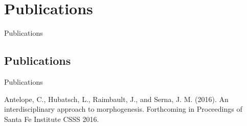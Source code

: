 

\chapter*{Publications}{Publications} %








\section*{Publications}{Publications}


\noindent Antelope, C., Hubatsch, L., Raimbault, J., and Serna, J. M. (2016). An interdisciplinary approach to morphogenesis. Forthcoming in Proceedings of Santa Fe Institute CSSS 2016.


